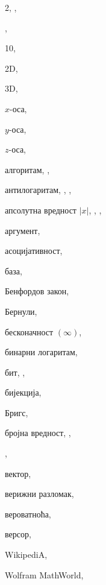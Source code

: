 \begin{theindex}
  \item 2, , 
  \item \4, 
  \item 10, 
  \indexskip
  \item 2D, 
  \item 3D, 

  \indexspace

  \item $x$-оса, 
  \item $y$-оса, 
  \item $z$-оса, 

  \indexspace

  \item алгоритам, , 
  \item антилогаритам, , , 
  \item апсолутна вредност $\vert x\vert$, 
		, , 
  \item аргумент, 
  \item асоцијативност, 

  \indexspace

  \item база, 
  \item Бенфордов закон, 
  \item Бернули, 
  \item бесконачност $(\infty)$, 
  \item бинарни логаритам, 
  \item бит, , 
  \item бијекција, 
  \item Бригс, 
  \item бројна вредност, , 
  \indexskip
  \item \BASIC, 

  \indexspace

  \item вектор, 
  \item верижни разломак, 
  \item вероватноћа, 
  \item версор, 
  \indexskip
  \item {\sc  WikipediA}, 
  \item Wolfram MathWorld, 


\end{theindex}
